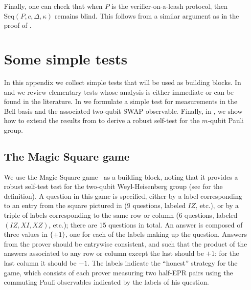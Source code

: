 \documentclass{toc}
\begin{document}
 Finally, one can check that when $P$ is the verifier-on-a-leash protocol, then $\mbox{Seq}(P,c,\Delta, \kappa)$ remains blind. This follows from a similar argument as in the proof of .
 
 
 
 
 
\appendix
\appendix




\section{Some simple tests}
\label{sec:clifford-test}


In this appendix we collect simple tests that will be used as building blocks. In  and  we review elementary tests whose analysis is either immediate or can be found in the literature. In  we formulate a simple test for measurements in the Bell basis and the associated two-qubit SWAP observable. 
Finally, in , we show how to extend the results from \cite{natarajan2016robust} to derive a robust self-test for the $m$-qubit Pauli group. 


\subsection{The Magic Square game}
\label{sec:ms}

We use the Magic Square game~\cite{Mermin90} as a building block, noting that it  provides a robust self-test test for the two-qubit Weyl-Heisenberg group (see  for the definition). A question in this game is specified, either by a label corresponding to an entry from the square pictured in  ($9$ questions, labeled $IZ$, etc.), or by a triple of labels corresponding to the same row or column ($6$ questions, labeled $(IZ,XI,XZ)$, etc.); there are 15 questions in total. An answer is composed of three values in $\{\pm 1\}$, one for each of the labels making up the question. Answers from the prover should be entrywise consistent, and such that the product of the answers associated to any row or column except the last should be $+1$; for the last column it should be $-1$. The labels indicate the ``honest'' strategy for the game, which consists of each prover measuring two half-EPR pairs using the commuting Pauli observables indicated by the labels of his question. 
\end{document}
